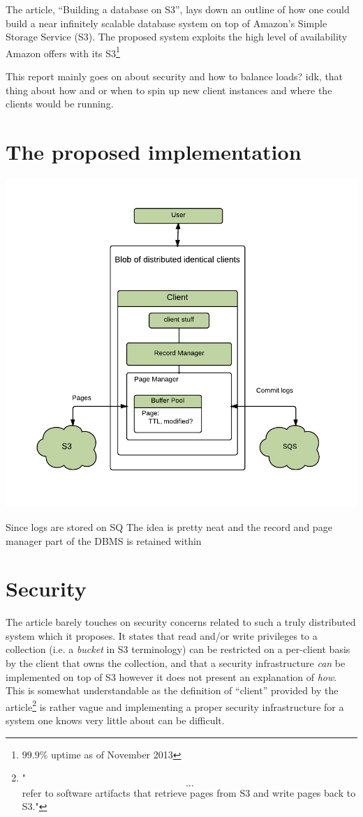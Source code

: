 \documentclass[11pt]{article}
\begin{document}
The article, ``Building a database on S3'', lays down an outline of how one could build a near infinitely scalable database system on top of Amazon's Simple Storage Service (S3).
The proposed system exploits the high level of availability Amazon offers with its S3\footnote{$99.9\%$ uptime as of November 2013}

This report mainly goes on about security and how to balance loads? idk, that thing about how and or when to spin up new client instances and where the clients would be running.

\section{The proposed implementation}

\includegraphics{img/proposed-architecture.pdf}

Since logs are stored on SQ
The idea is pretty neat and 
the record and page manager part of the DBMS is retained within 

\section{Security}
The article barely touches on security concerns related to such a truly distributed system which it proposes.
It states that read and/or write privileges to a collection (i.e. a \textit{bucket} in S3 terminology) can be restricted on a per-client basis by the client that owns the collection, and that a security infrastructure \textit{can} be implemented on top of S3 however it does not present an explanation of \textit{how}.
This is somewhat understandable as the definition of ``client'' provided by the article\footnote{"\[\dots\] refer to software artifacts that retrieve pages from S3 and write pages back to S3."} is rather vague and implementing a proper security infrastructure for a system one knows very little about can be difficult.
\end{document}
